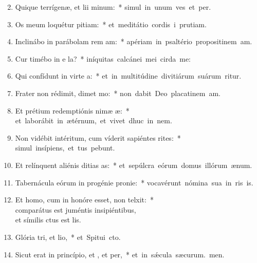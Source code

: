 \begin{flushleft}
\begin{enumerate}[leftmargin=*]
\setcounter{enumi}{1}

\item Quique terrígenæ, et lii minum:~* \mbox{simul in unum ves et per.}
\item Os meum loquétur pitiam:~* \mbox{et meditátio cordis i prutiam.}
\item Inclinábo in parábolam rem am:~* \mbox{apériam in psaltério propositinem am.}
\item Cur timébo in e la?~* \mbox{iníquitas calcánei mei cirda me:}
\item Qui confídunt in virte a:~* \mbox{et in multitúdine divitiárum suárum ritur.}
\item Frater non rédimit, dimet mo:~* \mbox{non dabit Deo placatinem am.}
\item Et prétium redemptiónis nimæ æ:~* \mbox{et laborábit in ætérnum, et vivet dhuc in nem.}
\item Non vidébit intéritum, cum víderit sapiéntes rites:~* \mbox{simul insípiens, et tus pebunt.}
\item Et relínquent aliénis ditias as:~* \mbox{et sepúlcra eórum domus illórum  ænum.}
\item Tabernácula eórum in progénie  pronie:~* \mbox{vocavérunt nómina sua in ris is.}
\item Et homo, cum in honóre esset, non telxit:~* \\comparátus est juméntis insipiéntibus, \\et símilis ctus est lis.
\item Glória tri, et lio,~* \mbox{et Spitui cto.}
\item Sicut erat in princípio, et , et per,~* \mbox{et in s\'{\ae}cula sæcurum. men.}

\end{enumerate}
\end{flushleft}

